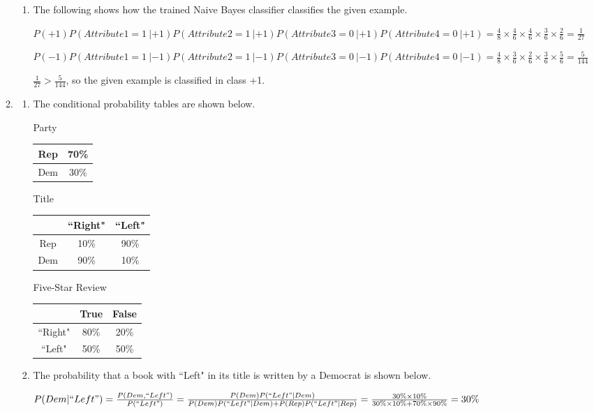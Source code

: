 \documentclass[11pt,letterpaper,oneside]{article}
\begin{document}
\begin{enumerate}
\begin{enumerate}
\begin{enumerate}
    \item The following shows how the trained Naive Bayes classifier classifies the given example.

$P(+1)P(Attribute1=1\ | +1)P(Attribute2=1\ | +1)P(Attribute3=0\ | +1)P(Attribute4=0\ | +1) = \frac{4}{8} \times \frac{4}{6} \times \frac{4}{6} \times \frac{3}{6} \times \frac{2}{6} = \frac{1}{27}$

$P(-1)P(Attribute1=1\ | -1)P(Attribute2=1\ | -1)P(Attribute3=0\ | -1)P(Attribute4=0\ | -1) = \frac{4}{8} \times \frac{3}{6} \times \frac{2}{6} \times \frac{3}{6} \times \frac{5}{6} = \frac{5}{144}$

$\frac{1}{27} > \frac{5}{144}$, so the given example is classified in class +1.
    \end{enumerate}

  \item 
    \begin{enumerate}
    \item The conditional probability tables are shown below.

  Party
  \begin{tabular}{|c|c|}
     \hline
     Rep& 70\%\\
     \hline
     Dem& 30\%\\
     \hline
  \end{tabular}

  Title
  \begin{tabular}{|c|c|c|}
     \hline
     & ``Right" & ``Left"\\
     \hline
     Rep& 10\% & 90\%\\
     \hline
     Dem& 90\% & 10\%\\
     \hline
  \end{tabular}

  Five-Star Review
  \begin{tabular}{|c|c|c|}
     \hline
     & True & False\\
     \hline
     ``Right"& 80\% & 20\%\\
     \hline
     ``Left"& 50\% & 50\%\\
     \hline
  \end{tabular}


    \item The probability that a book with ``Left" in its title is written by a Democrat is shown below.

$P(Dem | ``Left") = \frac{P(Dem, ``Left")}{P(``Left")} = \frac{P(Dem)P(``Left" | Dem)}{P(Dem)P(``Left" | Dem) + P(Rep)P(``Left" | Rep)} = \frac{30\% \times 10\%}{30\% \times 10\% + 70\% \times 90\%} = 30\%$


\end{enumerate}
\end{enumerate}
\end{enumerate}
\end{document}
